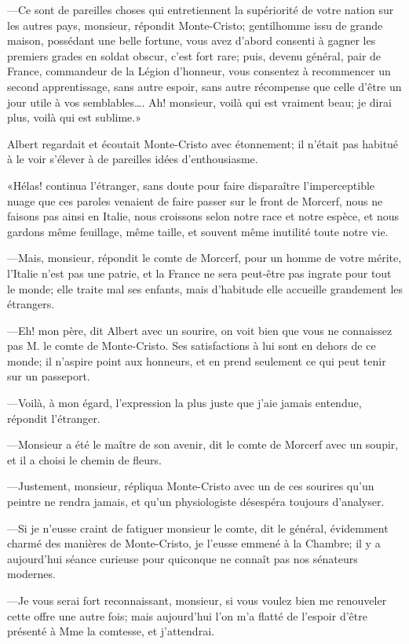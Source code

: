 —Ce sont de pareilles choses qui entretiennent la supériorité de votre nation sur les autres pays, monsieur, répondit Monte-Cristo; gentilhomme issu de grande maison, possédant une belle fortune, vous avez d'abord consenti à gagner les premiers grades en soldat obscur, c'est fort rare; puis, devenu général, pair de France, commandeur de la Légion d'honneur, vous consentez à recommencer un second apprentissage, sans autre espoir, sans autre récompense que celle d'être un jour utile à vos semblables\dots. Ah! monsieur, voilà qui est vraiment beau; je dirai plus, voilà qui est sublime.» 

Albert regardait et écoutait Monte-Cristo avec étonnement; il n'était pas habitué à le voir s'élever à de pareilles idées d'enthousiasme. 

«Hélas! continua l'étranger, sans doute pour faire disparaître l'imperceptible nuage que ces paroles venaient de faire passer sur le front de Morcerf, nous ne faisons pas ainsi en Italie, nous croissons selon notre race et notre espèce, et nous gardons même feuillage, même taille, et souvent même inutilité toute notre vie. 

—Mais, monsieur, répondit le comte de Morcerf, pour un homme de votre mérite, l'Italie n'est pas une patrie, et la France ne sera peut-être pas ingrate pour tout le monde; elle traite mal ses enfants, mais d'habitude elle accueille grandement les étrangers. 

—Eh! mon père, dit Albert avec un sourire, on voit bien que vous ne connaissez pas M. le comte de Monte-Cristo. Ses satisfactions à lui sont en dehors de ce monde; il n'aspire point aux honneurs, et en prend seulement ce qui peut tenir sur un passeport. 

—Voilà, à mon égard, l'expression la plus juste que j'aie jamais entendue, répondit l'étranger. 

—Monsieur a été le maître de son avenir, dit le comte de Morcerf avec un soupir, et il a choisi le chemin de fleurs. 

—Justement, monsieur, répliqua Monte-Cristo avec un de ces sourires qu'un peintre ne rendra jamais, et qu'un physiologiste désespéra toujours d'analyser. 

—Si je n'eusse craint de fatiguer monsieur le comte, dit le général, évidemment charmé des manières de Monte-Cristo, je l'eusse emmené à la Chambre; il y a aujourd'hui séance curieuse pour quiconque ne connaît pas nos sénateurs modernes. 

—Je vous serai fort reconnaissant, monsieur, si vous voulez bien me renouveler cette offre une autre fois; mais aujourd'hui l'on m'a flatté de l'espoir d'être présenté à Mme la comtesse, et j'attendrai. 

